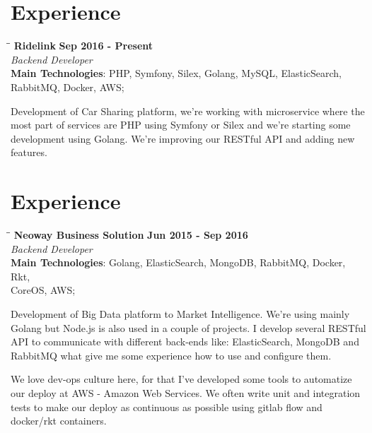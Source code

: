 \documentclass[margin]{res}
\begin{document}
\begin{resume}
\section{Experience}
\vspace{-0.1in}
    \begin{tabbing}
    \hspace{2.3in}\= \hspace{1.7in}\= \kill %
    \textbf{Ridelink}    \>\>\textbf{Sep 2016 - Present}\\
    \textit{Backend Developer}\\
    \textbf{Main Technologies}: PHP, Symfony, Silex, Golang, MySQL, ElasticSearch, RabbitMQ, Docker, AWS;
    \end{tabbing}\vspace{-20pt}      %
    \vspace{2mm}
Development of Car Sharing platform, we're working with microservice where the most part of services are PHP using Symfony or Silex and we're starting some development using Golang. We're improving our RESTful API and adding new features.

\section{Experience}
\vspace{-0.1in}
    \begin{tabbing}
    \hspace{2.3in}\= \hspace{1.7in}\= \kill %
    \textbf{Neoway Business Solution}    \>\>\textbf{Jun 2015 - Sep 2016}\\
    \textit{Backend Developer}\\
    \textbf{Main Technologies}: Golang, ElasticSearch, MongoDB, RabbitMQ, Docker, Rkt,\\CoreOS, AWS;
    \end{tabbing}\vspace{-20pt}      %
    \vspace{2mm}
Development of Big Data platform to Market Intelligence. We're using mainly Golang but Node.js is also used in a couple of projects. I develop several RESTful API to communicate with different back-ends like: ElasticSearch, MongoDB and RabbitMQ what give me some experience how to use and configure them.

We love dev-ops culture here, for that I've developed some tools to automatize our deploy at AWS - Amazon Web Services. We often write unit and integration tests to make our deploy as continuous as possible using gitlab flow and docker/rkt containers.


\end{resume}
\end{document}
